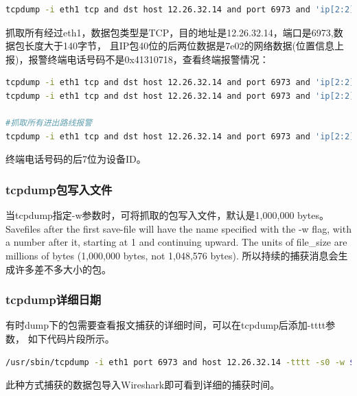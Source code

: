 \documentclass{book}
\begin{document}
\begin{lstlisting}[language=Bash]
tcpdump -i eth1 tcp and dst host 12.26.32.14 and port 6973 and 'ip[2:2]>0 and ip[41:2]=0x0200 and ip[53:4]!=0x00000000' -vv -X -c 100
\end{lstlisting}

抓取所有经过eth1，数据包类型是TCP，目的地址是12.26.32.14，端口是6973,数据包长度大于140字节，
且IP包40位的后两位数据是7e02的网络数据(位置信息上报)，报警终端电话号码不是0x41310718，查看终端报警情况：

\begin{lstlisting}[language=Bash]
tcpdump -i eth1 tcp and dst host 12.26.32.14 and port 6973 and 'ip[2:2]>0 and ip[41:2]=0x0200 and ip[53:4]!=0x00000000 and ip[46:4]!=0x41310718' -vv -X -c 100
tcpdump -i eth1 tcp and dst host 12.26.32.14 and port 6973 and 'ip[2:2]>100 and ip[41:2]=0x0200 and ip[53:4]==0x200000 and ip[46:4]!=0x41310718' -vv -X -c 10000

#抓取所有进出路线报警
tcpdump -i eth1 tcp and dst host 12.26.32.14 and port 6973 and 'ip[2:2]>0 and ip[41:2]=0x0200 and ip[53:4]==0x00100000' -vv -X -c 100
\end{lstlisting}

终端电话号码的后7位为设备ID。

\subsubsection{tcpdump包写入文件}

当tcpdump指定-w参数时，可将抓取的包写入文件，默认是1,000,000 bytes。
Savefiles after the first  save-file  will  have  the name specified with the -w flag, 
with a number after it, starting at 1 and continuing upward.  
The units of file\_size are millions of bytes (1,000,000 bytes, not 1,048,576 bytes).
所以持续的捕获消息会生成许多差不多大小的包。

\subsubsection{tcpdump详细日期}

有时dump下的包需要查看报文捕获的详细时间，可以在tcpdump后添加-tttt参数，
如下代码片段所示。

\begin{lstlisting}[language=Bash]
/usr/sbin/tcpdump -i eth1 port 6973 and host 12.26.32.14 -tttt -s0 -w $packageStoreDir/$currentTime.cap
\end{lstlisting}

此种方式捕获的数据包导入Wireshark即可看到详细的捕获时间。
\end{document}
